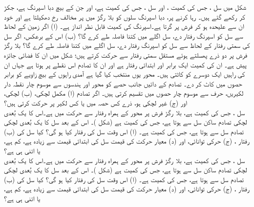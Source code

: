  شکل  میں سل  ، جس  کی کمیت  ،  اور سل  ، جس کی کمیت
  ہے، اور جن    کے بیچ دبا اسپرنگ   ہے،    جکڑ کر رکھے گئے ہیں۔ رہا کرنے پر، دبا اسپرنگ سلوں کو بلا رگڑ میں پر مخالف رخ دھکیلتا ہے اور خود ان سے علیحدہ ہو کر فرش پر گرتا ہے۔اسپرنگ کی کمیت قابل نظر انداز ہے۔ (ا)  اگر   زمین کے لحاظ سے سل  کو اسپرنگ  رفتار دے، سل  اگلے  میں کتنا فاصلہ طے کرے گا؟ (ب) اس کے برعکس، اگر      سل   کی سمتی رفتار کے لحاظ سے سل  کو اسپرنگ  رفتار دے، سل  اگلے  میں کتنا فاصلہ طے کرے گا؟
بلا رگڑ فرش پر دو ذرے پھسلتے ہوئے مستقل سمتی رفتار سے  حرکت کرتے ہیں؛ شکل  میں ان کا   فضائی جائزہ پیش  ہے۔ ان  کی کمیت  ایک برابر اور ابتدائی   رفتار   ہے اور ان کا تصادم اس نقطے پر ہوتا ہے جہاں ان کی راہیں ایک دوسرے کو کاٹتی ہیں۔ محور  یوں منتخب کیا گیا ہے  آمدی راہوں کے بیچ زاویے کو  برابر حصوں میں کاٹ کر   دے۔ تصادم کے  دائیں جانب حصے کو محور  اور ہندسوں سے موسوم  چار نقطہ دار لکیریں، حرف سے موسوم چار   حصوں    میں تقسیم کرتی ہیں۔ اگر تصادم (ا) مکمل لچکی، (ب) لچکی، اور  (ج) غیر لچکی ہو، ذرے کس حصہ میں یا کس لکیر پر  حرکت کرتی  ہیں؟
\\
سل   ،  جس کی کمیت   ہے، بلا رگڑ فرش پر محور   کے ہمراہ   رفتار سے حرکت میں ہے۔اس کا  یک بُعدی  لچکی تصادم ساکن سل  سے ہوتا ہے، جس کی کمیت  ہے (شکل )۔ اس کے بعد سل  کا  یک بُعدی لچکی تصادم سل  سے ہوتا ہے، جس کی کمیت  ہے۔ (ا) اس وقت سل   کی رفتار کیا ہو گی؟ کیا سل  کی (ب) رفتار ، (ج)   حرکی توانائی، اور (د) معیار حرکت کی قیمت   سل کی ابتدائی قیمت سے زیادہ ہے، کم ہے، یا اتنی ہی ہے؟
\\
سل   ،  جس کی کمیت   ہے، بلا رگڑ فرش پر محور  کے ہمراہ  رفتار سے حرکت میں ہے۔اس کا  یک بُعدی  لچکی تصادم ساکن سل  سے ہوتا ہے، جس کی کمیت  ہے (شکل )۔ اس کے بعد سل  کا  یک بُعدی لچکی تصادم سل  سے ہوتا ہے، جس کی کمیت  ہے۔ (ا) اس وقت سل   کی رفتار کیا ہو گی؟ کیا سل  کی (ب) رفتار ، (ج)   حرکی توانائی، اور (د) معیار حرکت کی قیمت سل کی ابتدائی قیمت سے زیادہ ہے، کم ہے، یا اتنی ہی ہے؟
